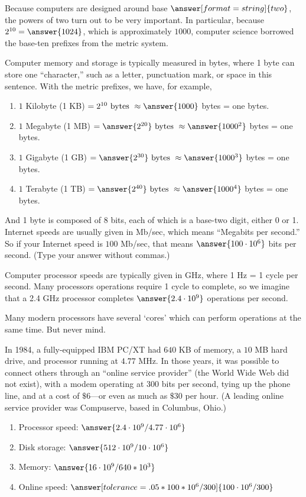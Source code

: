 \documentclass[nooutcomes]{ximera}
\begin{document}
Because computers are designed around base $\answer[format=string]{two}$, the powers of two turn out to be very important.  In particular, because $2^{10}=\answer{1024}$, which is approximately $1000$, computer science borrowed the base-ten prefixes from the metric system.  

Computer memory and storage is typically measured in bytes, where 1 byte can store one ``character,'' such as a letter, punctuation mark, or space in this sentence.  With the metric prefixes, we have, for example, 
\begin{enumerate}
\item $1$ Kilobyte (1 KB) $=  2^{10}\textrm{ bytes }\approx \answer{1000}$ bytes = one  bytes.
\item $1$ Megabyte (1 MB) $=  \answer{2^{20}} \textrm{ bytes } \approx \answer{1000^2}$ bytes = one  bytes.
\item $1$ Gigabyte (1 GB) $=  \answer{2^{30}} \textrm{ bytes } \approx \answer{1000^3}$ bytes = one  bytes.
\item $1$ Terabyte (1 TB) $=  \answer{2^{40}} \textrm{ bytes } \approx \answer{1000^4}$ bytes = one  bytes.
\end{enumerate}


And 1 byte is composed of 8 bits, each of which is a base-two digit, either 0 or 1.  Internet speeds are usually given in Mb/sec, which means ``Megabits per second.'' So if your Internet speed is $100$ Mb/sec, 
that means $\answer{100\cdot10^6}$ bits per second.  (Type your answer without commas.)

Computer processor speeds are typically given in GHz, where 1 Hz = 1 cycle per second.  Many processors operations require 1 cycle to complete, so we imagine that a 2.4 GHz processor completes $\answer{2.4\cdot10^9}$ operations per second.  

Many modern processors have several `cores' which can perform operations at the same time.  But never mind.  

In 1984, a fully-equipped IBM PC/XT had $640$ KB of memory, a $10$ MB hard drive, and processor running at $4.77$ MHz.  In those years, it was possible to connect others through an ``online service provider'' (the World Wide Web did not exist), with a modem operating at 300 bits per second, tying up the phone line, and at a cost of $\$6$---or even as much as $\$30$ per hour.  (A leading online service provider was Compuserve, based in Columbus, Ohio.)  

\begin{enumerate}
\item Processor speed: $\answer{2.4\cdot10^9/4.77\cdot10^6}$
\item Disk storage: $\answer{512\cdot10^9/10\cdot10^6}$
\item Memory: $\answer{16\cdot10^9/640*10^3}$
\item Online speed: $\answer[tolerance=.05*100*10^6/300]{100\cdot10^6/300}$
\end{enumerate}
\end{document}
